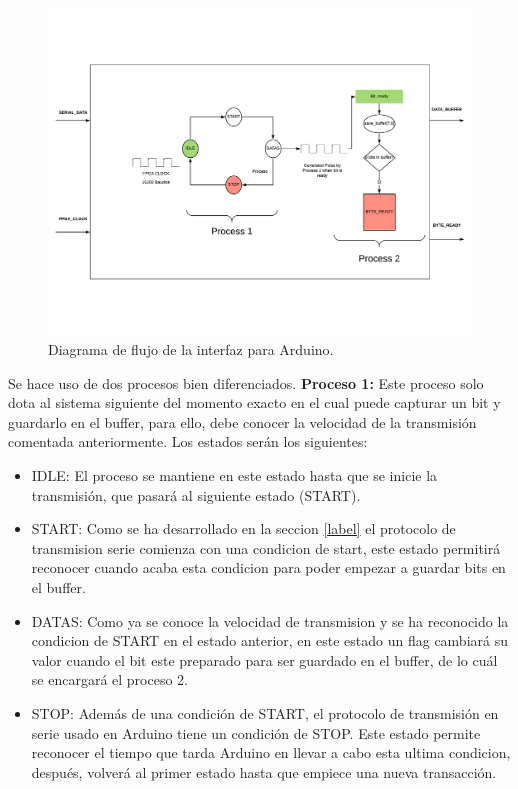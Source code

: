 \begin{center}
	\begin{figure}[H]
		\center
		\includegraphics[trim = 0mm 0mm 0mm 10mm, clip,scale=0.7, angle=90]{imagenes/Balancing_robot/arduino_interfacefluid.pdf}
		\caption{Diagrama de flujo de la interfaz para Arduino.}
		\label{fig:arduino_interfacefluid}
	\end{figure}
\end{center}

 Se hace uso de dos procesos bien diferenciados.\newline
\textbf{Proceso 1:} Este proceso solo dota al sistema siguiente del momento exacto en el cual puede capturar un bit y guardarlo en el buffer, para ello, debe conocer la velocidad de la transmisión comentada anteriormente. Los estados serán los siguientes: 

\begin{itemize}
	\item IDLE: El proceso se mantiene en este estado hasta que se inicie la transmisión, que pasará al siguiente estado (START).
	\item START: Como se ha desarrollado en la seccion \ref{label} el protocolo de transmision serie comienza con una condicion de start, este estado permitirá reconocer cuando acaba esta condicion para poder empezar a guardar bits en el buffer. 
	\item DATAS: Como ya se conoce la velocidad de transmision y se ha reconocido la condicion de START en el estado anterior, en este estado un flag cambiará su valor cuando el bit este preparado para ser guardado en el buffer, de lo cuál se encargará el proceso 2.
	\item STOP: Además de una condición de START, el protocolo de transmisión en serie usado en Arduino tiene un condición de STOP. Este estado permite reconocer el tiempo que tarda Arduino en llevar a cabo esta ultima condicion, después, volverá al primer estado hasta que empiece una nueva transacción.
\end{itemize}

